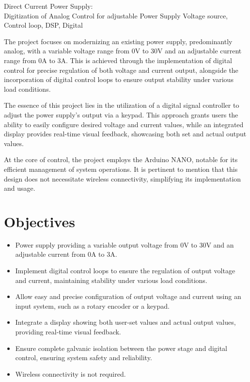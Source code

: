 
\begin{theabstract} {Direct Current Power Supply:\\Digitization of Analog Control for adjustable Power Supply} {Voltage source, Control loop, DSP, Digital}

The project focuses on modernizing an existing power supply, predominantly analog, with a variable voltage range from 0V to 30V and an adjustable current range from 0A to 3A. This is achieved through the implementation of digital control for precise regulation of both voltage and current output, alongside the incorporation of digital control loops to ensure output stability under various load conditions.

The essence of this project lies in the utilization of a digital signal controller to adjust the power supply's output via a keypad. This approach grants users the ability to easily configure desired voltage and current values, while an integrated display provides real-time visual feedback, showcasing both set and actual output values.

At the core of control, the project employs the Arduino NANO, notable for its efficient management of system operations. It is pertinent to mention that this design does not necessitate wireless connectivity, simplifying its implementation and usage.

\section*{Objectives}

\begin{itemize}
    \item Power supply providing a variable output voltage from 0V to 30V and an adjustable current from 0A to 3A.
    \item Implement digital control loops to ensure the regulation of output voltage and current, maintaining stability under various load conditions.
    \item Allow easy and precise configuration of output voltage and current using an input system, such as a rotary encoder or a keypad.
    \item Integrate a display showing both user-set values and actual output values, providing real-time visual feedback.
    \item Ensure complete galvanic isolation between the power stage and digital control, ensuring system safety and reliability.
    \item Wireless connectivity is not required.
\end{itemize}

\end{theabstract}

